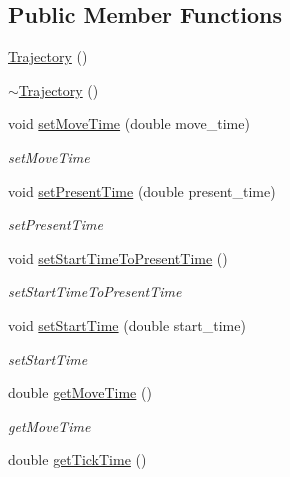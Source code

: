 \subsection*{Public Member Functions}
\begin{DoxyCompactItemize}
\item 
\hyperlink{classrobotis__manipulator_1_1_trajectory_ae549cd04019f4a985addb26c6a7ee1a1}{Trajectory} ()
\item 
\hyperlink{classrobotis__manipulator_1_1_trajectory_a89ee3aa113de35bced88abecbdb0b25e}{$\sim$\+Trajectory} ()
\item 
void \hyperlink{classrobotis__manipulator_1_1_trajectory_a0c400f1108635495fe7fc6cdae8bc8bb}{set\+Move\+Time} (double move\+\_\+time)
\begin{DoxyCompactList}\small\item\em set\+Move\+Time \end{DoxyCompactList}\item 
void \hyperlink{classrobotis__manipulator_1_1_trajectory_a187822acb94ca96938ebc06019ffc73e}{set\+Present\+Time} (double present\+\_\+time)
\begin{DoxyCompactList}\small\item\em set\+Present\+Time \end{DoxyCompactList}\item 
void \hyperlink{classrobotis__manipulator_1_1_trajectory_ad11707f44e3b0cefdb5f60b6c4f3ab77}{set\+Start\+Time\+To\+Present\+Time} ()
\begin{DoxyCompactList}\small\item\em set\+Start\+Time\+To\+Present\+Time \end{DoxyCompactList}\item 
void \hyperlink{classrobotis__manipulator_1_1_trajectory_a1c964bc02b44d87e1f7d02c446ab0f5d}{set\+Start\+Time} (double start\+\_\+time)
\begin{DoxyCompactList}\small\item\em set\+Start\+Time \end{DoxyCompactList}\item 
double \hyperlink{classrobotis__manipulator_1_1_trajectory_a998cdbaa9895e9a3ea6c7ec49f7b47d9}{get\+Move\+Time} ()
\begin{DoxyCompactList}\small\item\em get\+Move\+Time \end{DoxyCompactList}\item 
double \hyperlink{classrobotis__manipulator_1_1_trajectory_aa88cc828dc324d2441cfbafaff15dbb1}{get\+Tick\+Time} ()

\end{DoxyCompactItemize}
